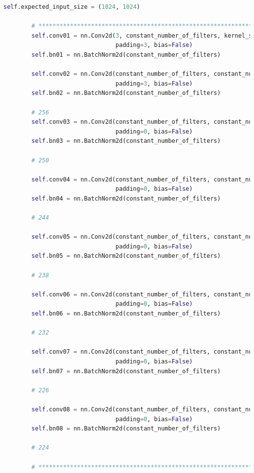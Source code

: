 \begin{minipage}{\linewidth}
\begin{lstlisting}[language=Python, caption=Python example, basicstyle=\tiny]
self.expected_input_size = (1024, 1024)

        # ************************************************************************************************
        self.conv01 = nn.Conv2d(3, constant_number_of_filters, kernel_size=7, stride=2,
                                padding=3, bias=False)
        self.bn01 = nn.BatchNorm2d(constant_number_of_filters)

        self.conv02 = nn.Conv2d(constant_number_of_filters, constant_number_of_filters, kernel_size=7, stride=2,
                                padding=3, bias=False)
        self.bn02 = nn.BatchNorm2d(constant_number_of_filters)

        # 256
        self.conv03 = nn.Conv2d(constant_number_of_filters, constant_number_of_filters, kernel_size=7, stride=1,
                                padding=0, bias=False)
        self.bn03 = nn.BatchNorm2d(constant_number_of_filters)

        # 250

        self.conv04 = nn.Conv2d(constant_number_of_filters, constant_number_of_filters, kernel_size=7, stride=1,
                                padding=0, bias=False)
        self.bn04 = nn.BatchNorm2d(constant_number_of_filters)

        # 244

        self.conv05 = nn.Conv2d(constant_number_of_filters, constant_number_of_filters, kernel_size=7, stride=1,
                                padding=0, bias=False)
        self.bn05 = nn.BatchNorm2d(constant_number_of_filters)

        # 238

        self.conv06 = nn.Conv2d(constant_number_of_filters, constant_number_of_filters, kernel_size=7, stride=1,
                                padding=0, bias=False)
        self.bn06 = nn.BatchNorm2d(constant_number_of_filters)

        # 232

        self.conv07 = nn.Conv2d(constant_number_of_filters, constant_number_of_filters, kernel_size=7, stride=1,
                                padding=0, bias=False)
        self.bn07 = nn.BatchNorm2d(constant_number_of_filters)

        # 226

        self.conv08 = nn.Conv2d(constant_number_of_filters, constant_number_of_filters, kernel_size=3, stride=1,
                                padding=0, bias=False)
        self.bn08 = nn.BatchNorm2d(constant_number_of_filters)

        # 224

        # ************************************************************************************************
\end{lstlisting}
\end{minipage}


